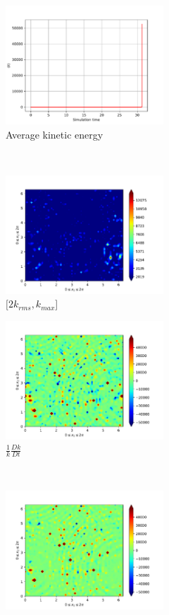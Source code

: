 \begin{figure}[H]
    \begin{subfigure}[H]{0.45\textwidth}
        \includegraphics[height=1.75in]{media/run-cds-65-25k/ke-average2449.png}
        \caption{Average kinetic energy}
    \end{subfigure}
    ~
    \begin{subfigure}[H]{0.45\textwidth}
        \includegraphics[height=1.75in]{media/run-cds-65-25k/ke-2-2449.png}
        \caption{$[2k_{rms}, k_{max} $] }
    \end{subfigure}
    \newline
    \begin{subfigure}[H]{0.45\textwidth}
        \includegraphics[height=1.75in]{media/run-cds-65-25k/ke-2449.png}
        \caption{$\frac{1}{k} \frac{D k}{Dt}$}
    \end{subfigure}
    ~
    \begin{subfigure}{0.45\textwidth}
        \includegraphics[height=1.75in]{media/run-cds-65-25k/A-ke-449.png}

\end{subfigure}
\end{figure}
